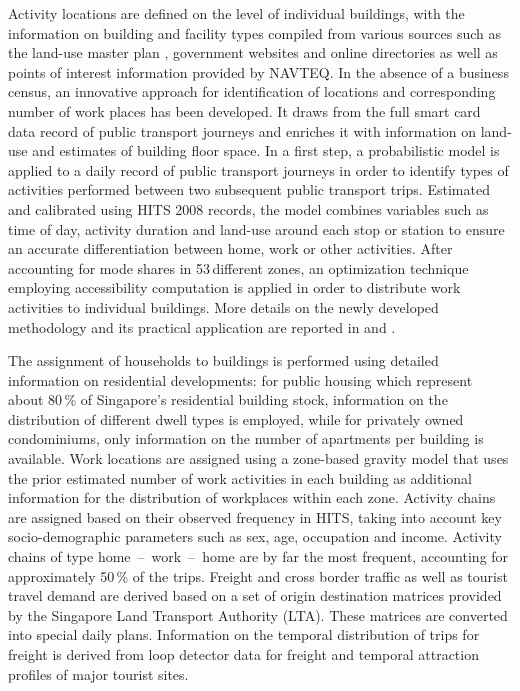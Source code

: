 Activity locations are defined on the level of individual buildings, with the information on building and facility types compiled from various sources such as the land-use master plan \citep[][]{URA_Rep_URA_2008}, government websites and online directories as well as points of interest information provided by NAVTEQ. In the absence of a business census, an innovative approach for identification of locations and corresponding number of work places has been developed. It draws from the full smart card data record of public transport journeys and enriches it with information on land-use and estimates of building floor space. In a first step, a probabilistic model is applied to a daily record of public transport journeys in order to identify types of activities performed between two subsequent public transport trips. Estimated and calibrated using HITS 2008 records, the model combines variables such as time of day, activity duration and land-use around each stop or station to ensure an accurate differentiation between home, work or other activities. After accounting for mode shares in 53\,different zones, an optimization technique employing accessibility computation is applied in order to distribute work activities to individual buildings. More details on the newly developed methodology and its practical application are reported in \citet[][]{ChakirovErath_IATBR_2012} and \citet[][]{OrdonezErath_TRR_2013}. 

The assignment of households to buildings is performed using detailed information on residential developments: for public housing which represent about 80\,\% of Singapore's residential building stock, information on the distribution of different dwell types is employed, while for privately owned condominiums, only information on the number of apartments per building is available. Work locations are assigned using a zone-based gravity model that uses the prior estimated number of work activities in each building as additional information for the distribution of workplaces within each zone. Activity chains are assigned based on their observed frequency in HITS, taking into account key socio-demographic parameters such as sex, age, occupation and income. Activity chains of type home~--~work~--~home are by far the most frequent, accounting for approximately 50\,\% of the trips.
Freight and cross border traffic as well as tourist travel demand are derived based on a set of origin destination matrices provided by the Singapore Land Transport Authority (LTA). These matrices are converted into special daily plans. Information on the temporal distribution of trips for freight is derived from loop detector data for freight and temporal attraction profiles of major tourist sites.

